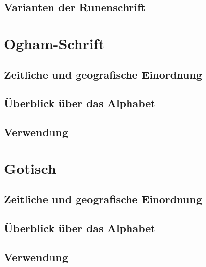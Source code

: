 \documentclass[a4paper]{article}
\begin{document}
\subsection{Varianten der Runenschrift}

\section{Ogham-Schrift}
\subsection{Zeitliche und geografische Einordnung}
\subsection{Überblick über das Alphabet}
\subsection{Verwendung}

\section{Gotisch}
\subsection{Zeitliche und geografische Einordnung}
\subsection{Überblick über das Alphabet}
\subsection{Verwendung}

\printbibliography
\end{document}
